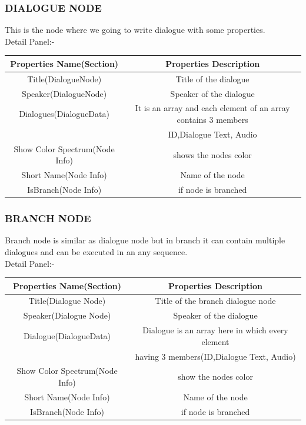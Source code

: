 \documentclass[12pt]{article}
\begin{document}
	  \subsubsection{DIALOGUE NODE}
	  This is the node where we going to write dialogue with some properties.\\
	  Detail Panel:-\\
	  \begin{center}
	  	\begin{tabular}{|c|c|}\hline
	  	Properties Name(Section) & Properties Description\\\hline\hline
	  	Title(DialogueNode) & Title of the dialogue\\\hline
	  	Speaker(DialogueNode) & Speaker of the dialogue\\\hline
	  	Dialogues(DialogueData) & It is an array and each element of an array contains 3 members\\
	  	& ID,Dialogue Text, Audio\\\hline 
	  		  		Show Color Spectrum(Node Info) & shows the nodes color\\\hline
			Short Name(Node Info) & Name of the node\\\hline
			IsBranch(Node Info) & if node is branched\\\hline
	  	\end{tabular}
	  \end{center}	   
	  \subsubsection{BRANCH NODE}
	  Branch node is similar as dialogue node but in branch it can contain multiple dialogues and can be executed in an any sequence.\\
	  Detail Panel:-\\
	  \begin{center}
	  \begin{tabular}{|c|c|}\hline
	  	Properties Name(Section) & Properties Description\\\hline\hline
	  	Title(Dialogue Node) &Title of the branch dialogue node\\\hline
	  	Speaker(Dialogue Node) & Speaker of the dialogue\\\hline
	  	Dialogue(DialogueData) & Dialogue is an array here in which every element\\
	  	& having 3 members(ID,Dialogue Text, Audio) \\\hline
	  	Show Color Spectrum(Node Info) & show the nodes 					color\\\hline
			Short Name(Node Info) & Name of the node\\\hline
			IsBranch(Node Info) & if node is branched\\\hline
	  
	  \end{tabular}
	  \end{center}
\end{document}
